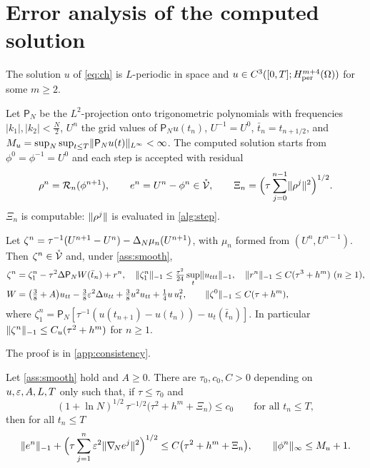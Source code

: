 \section{Error analysis of the computed solution}\label{sec:error}

\begin{assumption}\label{ass:smooth}
The solution $u$ of \eqref{eq:ch} is $L$-periodic in space and $u\in C^3([0,T];H^{m+4}_{\rm per}(\Omega))$ for some $m\ge2$.
\end{assumption}

Let $\mathsf P_N$ be the $L^2$-projection onto trigonometric polynomials with frequencies $|k_1|,|k_2|<\frac N2$, $U^n$ the grid values of $\mathsf P_Nu(t_n)$, $U^{-1}=U^0$, $\bar t_n=t_{n+1/2}$, and $M_u=\sup_N\sup_{t\le T}\lVert \mathsf P_Nu(t)\rVert_{L^\infty}<\infty$. The computed solution starts from $\phi^0=\phi^{-1}=U^0$ and each step is accepted with residual
\[
\rho^n=\mathcal{R}_n(\phi^{n+1}),\qquad e^n=U^n-\phi^n\in\mathring{\mathcal{V}},\qquad \Xi_n=\Big(\tau\sum_{j=0}^{n-1}\lVert \rho^j\rVert^2\Big)^{1/2}.
\]
$\Xi_n$ is computable: $\lVert \rho^j\rVert$ is evaluated in \cref{alg:step}.

\begin{lemma}[consistency]\label{lem:consistency}
Let $\zeta^n=\tau^{-1}(U^{n+1}-U^n)-\Delta_N\mu_n(U^{n+1})$, with $\mu_n$ formed from $(U^n,U^{n-1})$. Then $\zeta^n\in\mathring{\mathcal{V}}$ and, under \cref{ass:smooth},
\begin{align}
\zeta^n&=\zeta_1^n-\tau^2\Delta\mathsf P_N W(\bar t_n)+r^n,\quad \lVert \zeta_1^n\rVert_{-1}\le\tfrac{\tau^2}{24}\sup_t\lVert u_{ttt}\rVert_{-1},\quad \lVert r^n\rVert_{-1}\le C(\tau^3+h^m)\ (n\ge1),\label{eq:consistency}\\
W&=\big(\tfrac38+A\big)u_{tt}-\tfrac38\varepsilon^2\Delta u_{tt}+\tfrac38u^2u_{tt}+\tfrac14u\,u_t^2,\qquad \lVert \zeta^0\rVert_{-1}\le C(\tau+h^m),\notag
\end{align}
where $\zeta_1^n=\mathsf P_N[\tau^{-1}(u(t_{n+1})-u(t_n))-u_t(\bar t_n)]$. In particular $\lVert \zeta^n\rVert_{-1}\le C_u(\tau^2+h^m)$ for $n\ge1$.
\end{lemma}
The proof is in \cref{app:consistency}.

\begin{theorem}\label{thm:error}
Let \cref{ass:smooth} hold and $A\ge0$. There are $\tau_0,c_0,C>0$ depending on $u,\varepsilon,A,L,T$ only such that, if $\tau\le\tau_0$ and
\begin{equation}\label{eq:mild}
(1+\ln N)^{1/2}\,\tau^{-1/2}\big(\tau^2+h^m+\Xi_n\big)\le c_0\qquad\text{for all }t_n\le T,
\end{equation}
then for all $t_n\le T$
\begin{equation}\label{eq:errest}
\lVert e^n\rVert_{-1}+\Big(\tau\sum_{j=1}^n\varepsilon^2\lVert \nabla_{\!N} e^j\rVert^2\Big)^{1/2}\le C\big(\tau^2+h^m+\Xi_n\big),\qquad \lVert \phi^n\rVert_\infty\le M_u+1 .
\end{equation}
\end{theorem}

